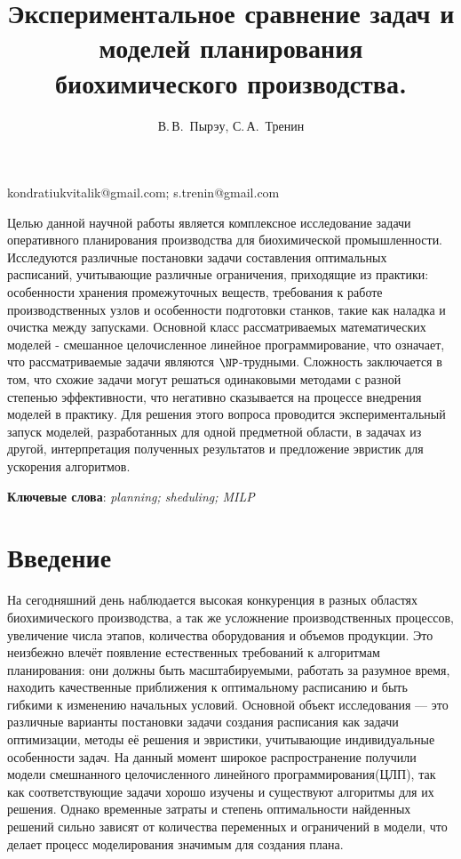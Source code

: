 \documentclass[12pt, twoside]{article}
\theoremstyle{definition}
\begin{document}
\title
    [Экспериментальное сравнение задач и моделей планирования биохимического производства.] %
    {Экспериментальное сравнение задач и моделей планирования биохимического производства.}
\author
    [В.\,В.~Пырэу, С.\,А.~Тренин] %
    {В.\,В.~Пырэу, С.\,А.~Тренин} %
\email
    {kondratiukvitalik@gmail.com; s.trenin@gmail.com}
\abstract
    {Целью данной научной работы является комплексное исследование задачи оперативного планирования производства для биохимической промышленности. Исследуются различные постановки задачи составления оптимальных расписаний, учитывающие различные ограничения, приходящие из практики: особенности хранения промежуточных веществ, требования к работе производственных узлов и особенности подготовки станков, такие как наладка и очистка между запусками. Основной класс рассматриваемых математических моделей - смешанное целочисленное линейное программирование, что означает, что рассматриваемые задачи являются $\NP$-трудными. Сложность заключается в том, что схожие задачи могут решаться одинаковыми методами с разной степенью эффективности, что негативно сказывается на процессе внедрения моделей в практику. Для решения этого вопроса проводится экспериментальный запуск моделей, разработанных для одной предметной области, в задачах из другой, интерпретация полученных результатов и предложение эвристик для ускорения алгоритмов.
    
    
\bigskip
\noindent
\textbf{Ключевые слова}: \emph {planning; sheduling; MILP}
}

\doi{}
\receivedRus{}
\receivedEng{}

\maketitle
\linenumbers

\section{Введение}
На сегодняшний день наблюдается высокая конкуренция в разных областях биохимического производства, а так же усложнение производственных процессов, увеличение числа этапов, количества оборудования и объемов продукции. Это неизбежно влечёт появление естественных требований к алгоритмам планирования: они должны быть масштабируемыми, работать за разумное время, находить качественные приближения к оптимальному расписанию и быть гибкими к изменению начальных условий. Основной объект исследования --- это различные варианты постановки задачи создания расписания как задачи оптимизации, методы её решения и эвристики, учитывающие индивидуальные особенности задач. На данный момент широкое распространение получили модели смешнанного целочисленного линейного программирования(ЦЛП), так как соответствующие задачи хорошо изучены и существуют алгоритмы для их решения. Однако временные затраты и степень оптимальности найденных решений сильно зависят от количества переменных и ограничений в модели, что делает процесс моделирования значимым для создания плана. 
\end{document}

